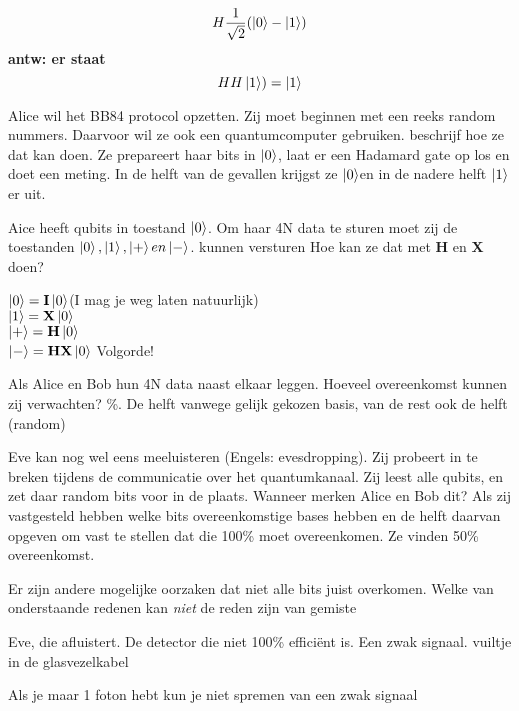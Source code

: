 \documentclass[a4paper, addpoints, 12pt
    , answers    %
    ]{exam}
\newcommand*{\port}[1]{\textbf{#1}}
\begin{document}
\begin{questions}
\[H\frac{1}{\sqrt{2}}(\ket{0}-\ket{1})\]
\ifprintanswers
\textbf{antw:
er staat \[HH\ket{1})=\ket{1}\]
}
\else
\fillwithlines{1in}
\fi


\question[1]
Alice wil het BB84 protocol opzetten. Zij moet beginnen met een reeks random nummers. Daarvoor wil ze ook een quantumcomputer gebruiken. beschrijf hoe ze dat kan doen.
\ifprintanswers
Ze prepareert haar bits in $\ket{0}$, laat er een Hadamard gate op los en doet een meting. In de helft van de gevallen krijgst ze $\ket{0}$en in de nadere helft $\ket{1}$ er uit.
\else
\fillwithlines{1in}
\fi

\question[1]
Aice heeft qubits in toestand $\ket{0}$. Om haar 4N data te sturen moet zij de toestanden $\ket{0}, \ket{1}, \ket{+} en \ket{-}$. kunnen versturen
Hoe kan ze dat met \port{H} en \port{X} doen?

\ifprintanswers
\else
$\ket{0}=\port{I}\ket{0}$(I mag je weg laten natuurlijk)\\
$\ket{1}=\port{X}\ket{0}$\\
$\ket{+}=\port{H}\ket{0}$\\
$\ket{-}=\port{H}\port{X}\ket{0}$ Volgorde!\\
\fillwithlines{1in}
\fi

\question[1]
Als Alice en Bob hun 4N data naast elkaar leggen. Hoeveel overeenkomst kunnen zij verwachten?
\%. De helft vanwege gelijk gekozen basis, van de rest ook de helft (random)
\else
\fillwithlines{1in}
\fi

Eve kan nog wel eens meeluisteren (Engels: evesdropping).  Zij probeert in te breken tijdens de communicatie over het quantumkanaal. 
Zij leest alle qubits, en zet daar random bits voor in de plaats.
Wanneer merken Alice en Bob dit?
\ifprintanswers
Als zij vastgesteld hebben welke bits overeenkomstige bases hebben en de  helft daarvan opgeven om vast te stellen dat die 100\% moet overeenkomen. Ze vinden 50\% overeenkomst.
\else
\fillwithlines{1in}
\fi

Er zijn andere mogelijke oorzaken dat niet alle bits juist overkomen. Welke van onderstaande redenen kan \textit{niet} de  reden zijn van gemiste

\begin{choices}
\choice Eve, die afluistert.
\choice De detector die niet 100\% effici\"ent is.
\correctchoice Een zwak signaal.
\choice vuiltje in de glasvezelkabel
\end{choices} 
\question[1]
\ifprintanswers
Als je maar 1 foton hebt kun je niet spremen van een zwak signaal
\else
\fillwithlines{1in}
\fi


\end{questions}
\end{document}
